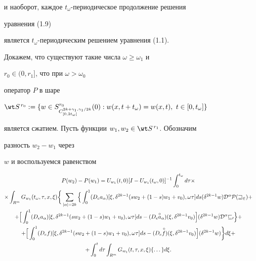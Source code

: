 и наоборот, каждое $t_\omega$-периодическое продолжение решения 


уравнения (1.9) 


является $t_\omega$-пе\-ри\-о\-ди\-чес\-ким решением уравнения (1.1). 


 


Докажем, что существуют такие числа $\omega\ge\omega_1$ и 


$r_0\in(0,r_1]$, что при $\omega>\omega_0$ 


оператор $P$ в шаре 


$\wt S^{\,r_0}:=\{w\in 


S^{r_0}_{C^{2k+\gamma_1,\gamma_1/2k}_{[0,2t_\omega]}}(0): 


w(x,t+t_\omega)=w(x,t),\ t\in[0,t_\omega]\}$ 


является сжатием. Пусть функции $w_1,w_2\in\wt S^{\,r_1}$. Обозначим 


разность $w_2-w_1$ через 


$w$ и воспользуемся равенством 


\begin{multline} 


P(w_2)-P(w_1)=U_{w_1}(t,0)[I-U_{w_1}(t_\omega,0)]^{-1} 


\int^{t_\omega}_0d\tau\times \\ 


% 


\times \int_{R^m}G_{w_1}(t_\omega,\tau,x,\xi)\bigg\{ 


\sum_{|\alpha|=2k}\Big\{\int^1_0(D_e a_\alpha) 


[\xi,\delta^{2k-1}(s w_2+(1-s)w_1+v_0),\omega\tau]ds 


(\delta^{2k-1}w)\cal D^\alpha P(w_2)+ \\ 


% 


+\Big[\int^1_0(D_e a_\alpha)[\xi,\delta^{2k-1} 


(s w_2+(1-s)w_1+v_0),\omega\tau]ds- 


(D_e\up{\circ}{a}_\alpha)(\xi,\delta^{2k-1}v_0)\Big] 


(\delta^{2k-1}w)\cal D^\alpha v_0\Big\}+ \\ 


% 


+\Big[\int^1_0(D_e f)[\xi,\delta^{2k-1}(s w_2+(1-s) 


w_1+v_0),\omega\tau]ds-(D_e\up{\,\circ}{f}) 


(\xi,\delta^{2k-1}v_0)\Big](\delta^{2k-1}w)\bigg\}d\xi+ \\


%


+\int^t_0d\tau\int_{R^m}G_{w_1}(t,\tau,x,\xi) 


\{\dotsc\}d\xi. 


\end{multline} 


